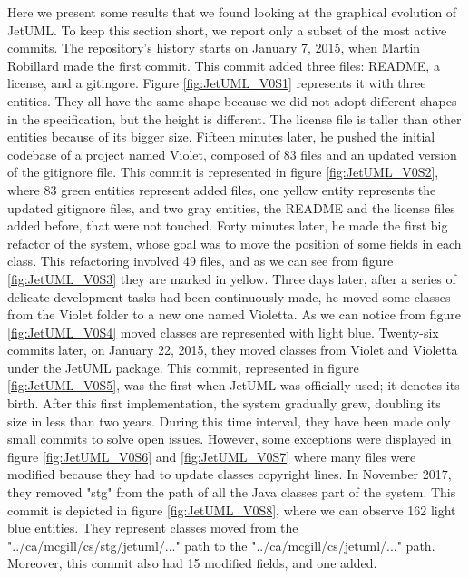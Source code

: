 Here we present some results that we found looking at the graphical evolution of JetUML. 
To keep this section short, we report only a subset of the most active commits. 
\bigbreak
The repository's history starts on January 7, 2015, when Martin Robillard made the first commit. 
This commit added three files: README, a license, and a gitingore. 
Figure \ref{fig:JetUML_V0S1} represents it with three entities. They all have the same shape because we did not adopt different shapes in the specification, but the height is different. The license file is taller than other entities because of its bigger size. 
\bigbreak
Fifteen minutes later, he pushed the initial codebase of a project named Violet, composed of 83 files and an updated version of the gitignore file. This commit is represented in figure \ref{fig:JetUML_V0S2}, where 83 green entities represent added files, one yellow entity represents the updated gitignore files, and two gray entities, the README and the license files added before, that were not touched.
\bigbreak
Forty minutes later, he made the first big refactor of the system, whose goal was to move the position of some fields in each class. This refactoring involved 49 files, and as we can see from figure \ref{fig:JetUML_V0S3} they are marked in yellow. 
\bigbreak
Three days later, after a series of delicate development tasks had been continuously made, he moved some classes from the Violet folder to a new one named Violetta. As we can notice from figure \ref{fig:JetUML_V0S4} moved classes are represented with light blue. 
\bigbreak
Twenty-six commits later, on January 22, 2015, they moved classes from Violet and Violetta under the JetUML package. This commit, represented in figure \ref{fig:JetUML_V0S5}, was the first when JetUML was officially used; it denotes its birth. 
\bigbreak
After this first implementation, the system gradually grew, doubling its size in less than two years. 
During this time interval, they have been made only small commits to solve open issues. However, some exceptions were displayed in figure \ref{fig:JetUML_V0S6} and \ref{fig:JetUML_V0S7} where many files were modified because they had to update classes copyright lines. 
\bigbreak
In November 2017, they removed "stg" from the path of all the Java classes part of the system. This commit is depicted in figure \ref{fig:JetUML_V0S8}, where we can observe 162 light blue entities. They represent classes moved from the "../ca/mcgill/cs/stg/jetuml/..." path to the 
"../ca/mcgill/cs/jetuml/..." path. Moreover, this commit also had 15 modified fields, and one added. 
\bigbreak
